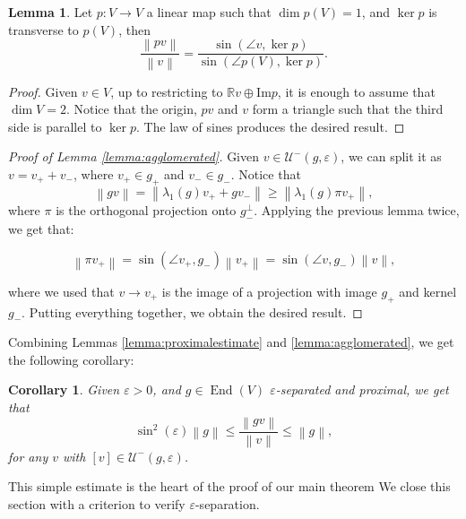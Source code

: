 \documentclass{amsart}
\DeclareMathOperator{\End}{End}
\newcommand{\norm}[1]{\left\lVert#1\right\rVert}
\newtheorem{coro}[thm]{Corollary}
\theoremstyle{remark}
\theoremstyle{definition}
\newtheorem{lem}[thm]{Lemma}
\begin{document}
\begin{lem}
\label{lem:lawofsines}
 Let $p: V \to V$ a linear map such that $\dim p(V) =1$, and $\ker p$ is transverse to $p(V)$, then
    $$\frac{\norm{pv}}{\norm{v}} = \frac{\sin (\angle v, \ker p)}{\sin (\angle p(V), \ker p)}.$$
    \begin{proof}
 Given $v \in V$, up to restricting to $\mathbb{R} v \oplus \text{Im} p$, it is enough to assume that $\dim V = 2$.
 Notice that the origin, $p v$ and $v$ form a triangle such that the third side is parallel to $\ker p$.
 The law of sines produces the desired result.
    \end{proof}
\end{lem}

\begin{proof}[Proof of Lemma \ref{lemma:agglomerated}]
 Given $v \in \mathcal{U}^-(g,\varepsilon)$, we can split it as $v = v_+ + v_-$, where $v_+ \in g_+$ and $v_- \in g_-$.
 Notice that
 $$\norm{gv} = \norm{\lambda_1 (g) v_+ + g v_-} \geq \norm{ \lambda_1 (g) \pi v_+},$$
 where $\pi$ is the orthogonal projection onto $g_-^\perp$.
 Applying the previous lemma twice, we get that:
 
 $$\norm{\pi v_+} = \sin (\angle v_+, g_-) \norm{v_+} = \sin (\angle v, g_-) \norm{v},$$

 where we used that $v \to v_+$ is the image of a projection with image $g_+$ and kernel $g_-$.
 Putting everything together, we obtain the desired result.
\end{proof}

Combining Lemmas \ref{lemma:proximalestimate} and \ref{lemma:agglomerated}, we get the following corollary:

\begin{coro}
\label{lemma:busemannprox}
 Given $\varepsilon > 0$, and $g \in \End (V)$ $\varepsilon$-separated and proximal, we get that
 $$\sin^2 (\varepsilon) \norm{g} \leq \frac{\norm{gv}}{\norm{v}} \leq \norm{g},$$
 for any $v$ with $[v] \in \mathcal{U}^- (g,\varepsilon)$.
\end{coro}

This simple estimate is the heart of the proof of our main theorem
We close this section with a criterion to verify $\varepsilon$-separation.
\end{document}
